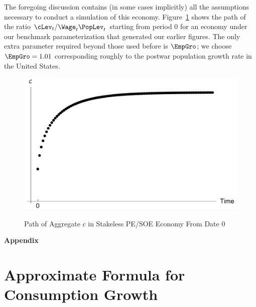 \documentclass{handout}
\begin{document}
The foregoing discussion contains (in some cases implicitly) all the
assumptions necessary to conduct a simulation of this economy.
Figure~\ref{fig:SOENoStakescPath} shows the path of the ratio $\cLev_{t}/\Wage_{t}\PopLev_{t}$ starting from
period 0 for an economy under our benchmark parameterization that generated
our earlier figures.  The
only extra parameter required beyond those used before is $\EmpGro$; we choose $\EmpGro=1.01$ corresponding
roughly to the postwar population growth rate in the United States.

\begin{figure}
\caption{Path of Aggregate $c$ in Stakeless PE/SOE Economy From Date 0}
\includegraphics[width=6in]{../Figures/SOENoStakescPath}
\label{fig:SOENoStakescPath}
\end{figure}



\label{sec:PFwhenFHWfails}
\pagebreak\appendix
\centerline\textbf{\LARGE Appendix}\medskip

\setcounter{section}{0}

\section{Approximate Formula for Consumption Growth}\label{sec:CGroApprox}
\end{document}
